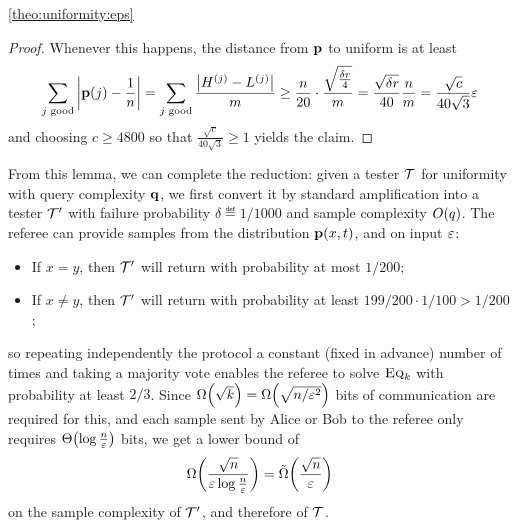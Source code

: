 \begin{proofof}{\cref{theo:uniformity:eps}}
\begin{proof}
  Whenever this happens, the distance from $\p$ to uniform is at least 
  \[
  \sum_{j\text{ \text{good}}} \abs{\p(j) - \frac{1}{n}} = \sum_{j\text{ \text{good}}} \frac{\abs{H^{(j)} - L^{(j)}}}{m} \geq \frac{n}{20}\cdot \frac{\sqrt{\frac{\delta r}{4}}}{m} = \frac{\sqrt{\delta r}}{40} \frac{n}{m} = \frac{\sqrt{c}}{40\sqrt{3}}\eps
  \]
  and choosing $c \geq 4800$ so that $\frac{\sqrt{c}}{40\sqrt{3}} \geq 1$ yields the claim.
\end{proof}

From this lemma, we can complete the reduction: given a tester $\Tester$ for uniformity with query complexity $\q$, we first convert it by standard amplification into a tester $\Tester^\prime$ with failure probability $\delta\eqdef 1/1000$ and sample complexity $\bigO{q}$. The referee can provide samples from the distribution $\p(x,t)$, and on input $\eps$:
\begin{itemize}
  \item If $x=y$, then $\Tester^\prime$ will return \reject with probability at most $1/200$;
  \item If $x\neq y$, then $\Tester^\prime$ will return \reject with probability at least $199/200\cdot 1/100 > 1/200$;
\end{itemize} 
so repeating independently the protocol a constant (fixed in advance) number of times and taking a majority vote enables the referee to solve $\EQ[k]$ with probability at least $2/3$. Since $\bigOmega{\sqrt{k}} = \bigOmega{\sqrt{n/\eps^2}}$ bits of communication are required for this, and each sample sent by Alice or Bob to the referee only requires $\bigTheta{\log \frac{n}{\eps}}$ bits, we get a lower bound of 
\[
    \bigOmega{\frac{\sqrt{n}}{\eps\log \frac{n}{\eps}}} = \tildeOmega{\frac{\sqrt{n}}{\eps}}
\]
on the sample complexity of $\Tester^\prime$, and therefore of $\Tester$.
\end{proofof}
 
